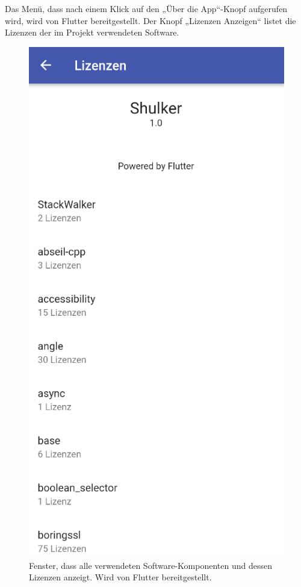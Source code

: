 Das Menü, dass nach einem Klick auf den „Über die App“-Knopf aufgerufen wird, wird von Flutter bereitgestellt.
Der Knopf „Lizenzen Anzeigen“ listet die Lizenzen der im Projekt verwendeten Software. 

\begin{figure}[H]
    \begin{center}
        \includegraphics[width=.4\textwidth]{images/mobile/Licences.png}
        \caption{Fenster, dass alle verwendeten Software-Komponenten und dessen Lizenzen anzeigt. 
        Wird von Flutter bereitgestellt. }
    \end{center}
\end{figure}